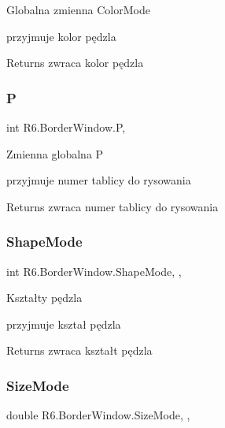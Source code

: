 Globalna zmienna Color\+Mode 

przyjmuje kolor pędzla 

\begin{DoxyReturn}{Returns}
zwraca kolor pędzla 
\end{DoxyReturn}
\mbox{\label{class_r6_1_1_border_window_a67c1b3f2b97016169c2c6f44944886e3}} 
\subsubsection{\texorpdfstring{P}{P}}
{\footnotesize\ttfamily int R6.\+Border\+Window.\+P\hspace{0.3cm}{\ttfamily [get]}, {\ttfamily [set]}}



Zmienna globalna P 

przyjmuje numer tablicy do rysowania 

\begin{DoxyReturn}{Returns}
zwraca numer tablicy do rysowania 
\end{DoxyReturn}
\mbox{\label{class_r6_1_1_border_window_a975d53917e4349a57833760f5b06aca1}} 
\subsubsection{\texorpdfstring{ShapeMode}{ShapeMode}}
{\footnotesize\ttfamily int R6.\+Border\+Window.\+Shape\+Mode\hspace{0.3cm}{\ttfamily [get]}, {\ttfamily [set]}, {\ttfamily [private]}}



Kształty pędzla 

przyjmuje kształ pędzla 

\begin{DoxyReturn}{Returns}
zwraca kształt pędzla 
\end{DoxyReturn}
\mbox{\label{class_r6_1_1_border_window_a4f1a4e5f68aa130734eda8cc1cd58610}} 
\subsubsection{\texorpdfstring{SizeMode}{SizeMode}}
{\footnotesize\ttfamily double R6.\+Border\+Window.\+Size\+Mode\hspace{0.3cm}{\ttfamily [get]}, {\ttfamily [set]}, {\ttfamily [private]}}



